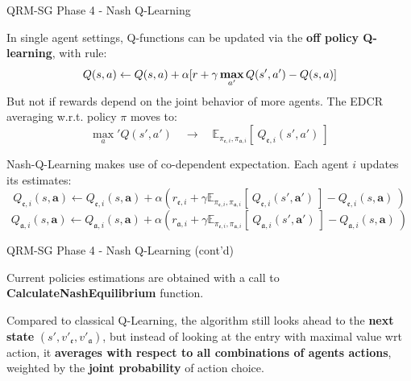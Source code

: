 \documentclass[10pt, aspectratio=169]{beamer}
\newcommand{\evidenzia}[1]{\textcolor{verdeSalvia}{\textbf{#1}}}
\begin{document}
\begin{frame}{QRM-SG Phase 4 - Nash Q-Learning}

In single agent settings, Q-functions can be updated via the \evidenzia{off policy Q-learning}, with rule: %
    $$Q(s,a) \leftarrow Q(s,a) + \alpha[r + \gamma \mathop{\mathbf{\color{black}{max}}}_{a'} Q(s',a') - Q(s,a)]$$
    But not if rewards depend on the joint behavior of more agents. The EDCR averaging w.r.t. policy $\pi$ moves to:
    $$\max_a' Q(s',a') \quad \longrightarrow \quad 
    \mathbb{E}_{\pi_{\mathfrak{e},i},\pi_{\mathfrak{a},i}}[\ Q_{\mathfrak{e},i}(s',a')\ ] $$

    
    Nash-Q-Learning makes use of  co-dependent expectation. Each agent $i$ updates its estimates:
    $$Q_{\mathfrak{e},i} (s,\textbf{a}) \leftarrow Q_{\mathfrak{e},i} (s,\textbf{a}) + \alpha (r_{\mathfrak{e},i} + \gamma \mathbb{E}_{\pi_{\mathfrak{e},i},\pi_{\mathfrak{a},i}} [\ Q_{\mathfrak{e},i}(s',\textbf{a}') \ ] - Q_{\mathfrak{e},i}(s,\textbf{a})\ )$$    
    $$Q_{\mathfrak{a},i} (s,\textbf{a}) \leftarrow Q_{\mathfrak{a},i} (s,\textbf{a}) + \alpha (r_{\mathfrak{a},i} + \gamma \mathbb{E}_{\pi_{\mathfrak{e},i},\pi_{\mathfrak{a},i}} [\ Q_{\mathfrak{a},i}(s',\textbf{a}') \ ] - Q_{\mathfrak{a},i}(s,\textbf{a})\ )$$    

\end{frame}

\begin{frame}{QRM-SG Phase 4 - Nash Q-Learning (cont'd)}

    Current policies estimations are obtained with a call to \textbf{CalculateNashEquilibrium} function.
    \vspace{0.5cm}

    Compared to classical Q-Learning, the algorithm still looks ahead to the \evidenzia{next state} $(s',v'_\mathfrak{e}, v'_\mathfrak{a})$, but instead of looking at the entry with maximal value wrt action, it \evidenzia{averages with respect to all combinations of agents actions}, weighted by the \evidenzia{joint probability} of action choice.
    
    \vspace{0.5cm}
    
    
\end{frame}
\end{document}
